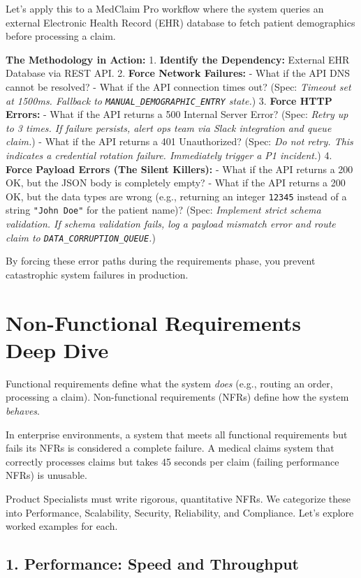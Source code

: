 \documentclass[
  11pt,
  openany,
  oneside]{book}
\begin{document}
Let's apply this to a MedClaim Pro workflow where the system queries an
external Electronic Health Record (EHR) database to fetch patient
demographics before processing a claim.

\textbf{The Methodology in Action:} 1. \textbf{Identify the Dependency:}
External EHR Database via REST API. 2. \textbf{Force Network Failures:}
- What if the API DNS cannot be resolved? - What if the API connection
times out? (Spec: \emph{Timeout set at 1500ms. Fallback to
\texttt{MANUAL\_DEMOGRAPHIC\_ENTRY} state.}) 3. \textbf{Force HTTP
Errors:} - What if the API returns a 500 Internal Server Error? (Spec:
\emph{Retry up to 3 times. If failure persists, alert ops team via Slack
integration and queue claim.}) - What if the API returns a 401
Unauthorized? (Spec: \emph{Do not retry. This indicates a credential
rotation failure. Immediately trigger a P1 incident.}) 4. \textbf{Force
Payload Errors (The Silent Killers):} - What if the API returns a 200
OK, but the JSON body is completely empty? - What if the API returns a
200 OK, but the data types are wrong (e.g., returning an integer
\texttt{12345} instead of a string \texttt{"John\ Doe"} for the patient
name)? (Spec: \emph{Implement strict schema validation. If schema
validation fails, log a payload mismatch error and route claim to
\texttt{DATA\_CORRUPTION\_QUEUE}.})

By forcing these error paths during the requirements phase, you prevent
catastrophic system failures in production.

\section{Non-Functional Requirements Deep
Dive}\label{non-functional-requirements-deep-dive}

Functional requirements define what the system \emph{does} (e.g.,
routing an order, processing a claim). Non-functional requirements
(NFRs) define how the system \emph{behaves}.

In enterprise environments, a system that meets all functional
requirements but fails its NFRs is considered a complete failure. A
medical claims system that correctly processes claims but takes 45
seconds per claim (failing performance NFRs) is unusable.

Product Specialists must write rigorous, quantitative NFRs. We
categorize these into Performance, Scalability, Security, Reliability,
and Compliance. Let's explore worked examples for each.

\subsection{1. Performance: Speed and
Throughput}\label{performance-speed-and-throughput}
\end{document}
